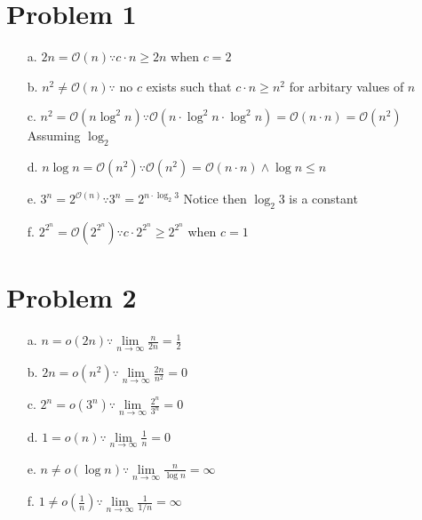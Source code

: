 \documentclass{article}
\newenvironment{problem}[1]{
  \nobreak\section*{Problem #1}
}{}
\newcommand*{\bigO}[1]{\ensuremath{\mathcal{O}\left(#1\right)}}
\begin{document}
  \begin{problem}{1}
    \begin{enumerate}
      \item[a.] $2n = \bigO{n} \because c \cdot n \ge 2n$ when $c = 2$
      \item[b.] $n^2 \neq \bigO{n} \because$ no $c$ exists such that $c \cdot n \ge n^2$ for arbitary values of $n$
      \item[c.] $n^2 = \bigO{n\log^2n} \because \bigO{n\cdot\log^2n\cdot\log^2n} = \bigO{n\cdot n} = \bigO{n^2}$ Assuming $\log_2$
      \item[d.] $n\log{n} = \bigO{n^2} \because \bigO{n^2} = \bigO{n \cdot n} \wedge \log{n} \le n$
      \item[e.] $3^n = 2^{\bigO{n}} \because 3^n = 2^{n\cdot\log_2{3}}$ Notice then $\log_2{3}$ is a constant
      \item[f.] $2^{2^n} = \bigO{2^{2^n}} \because c \cdot 2^{2^n} \ge 2^{2^n}$ when $c = 1$
    \end{enumerate}
  \end{problem}

  \begin{problem}{2}
    \begin{enumerate}
      \item[a.] $n = o(2n) \because \lim\limits_{n \to \infty}\frac{n}{2n}=\frac{1}{2}$
      \item[b.] $2n = o(n^2) \because \lim\limits_{n \to \infty}\frac{2n}{n^2}=0$
      \item[c.] $2^n = o(3^n) \because \lim\limits_{n \to \infty}\frac{2^n}{3^n}=0$
      \item[d.] $1 = o(n) \because \lim\limits_{n \to \infty}\frac{1}{n}=0$
      \item[e.] $n \neq o(\log{n}) \because \lim\limits_{n \to \infty}\frac{n}{\log{n}}=\infty$
      \item[f.] $1 \neq o(\frac{1}{n}) \because \lim\limits_{n \to \infty}\frac{1}{1/n}=\infty$   
    \end{enumerate}
  \end{problem}
\end{document}
